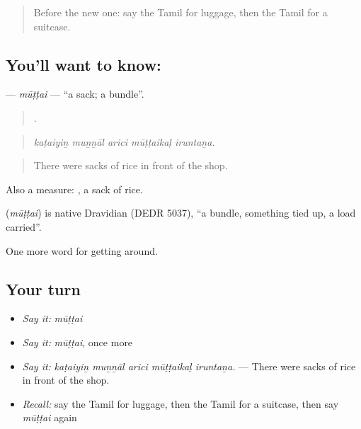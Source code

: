 \begin{quote}
Before the new one: say the Tamil for luggage, then the Tamil for a suitcase.
\end{quote}

\subsection*{You'll want to know: }
\textbf{} — \emph{mūṭṭai} — \textquotedblleft{}a sack; a bundle\textquotedblright{}.

\begin{quote}
    .
\end{quote}

\begin{quote}
\emph{kaṭaiyiṉ muṉṉāl arici mūṭṭaikaḷ iruntaṉa.}
\end{quote}

\begin{quote}
There were sacks of rice in front of the shop.
\end{quote}

Also a measure:   , a sack of rice.

\begin{cousinweb}
\textbf{} (\emph{mūṭṭai}) is native Dravidian (DEDR 5037), \textquotedblleft{}a bundle, something tied up, a load carried\textquotedblright{}.
\end{cousinweb}

\begin{grammarlens}[title={What you've built}]
One more word for getting around.
\end{grammarlens}

\subsection*{Your turn}
\begin{itemize}
\raggedright
  \item \emph{Say it:} \emph{mūṭṭai}
  \item \emph{Say it:} \emph{mūṭṭai}, once more
  \item \emph{Say it:} \emph{kaṭaiyiṉ muṉṉāl arici mūṭṭaikaḷ iruntaṉa.} — There were sacks of rice in front of the shop.
  \item \emph{Recall:} say the Tamil for luggage, then the Tamil for a suitcase, then say \emph{mūṭṭai} again
\end{itemize}

